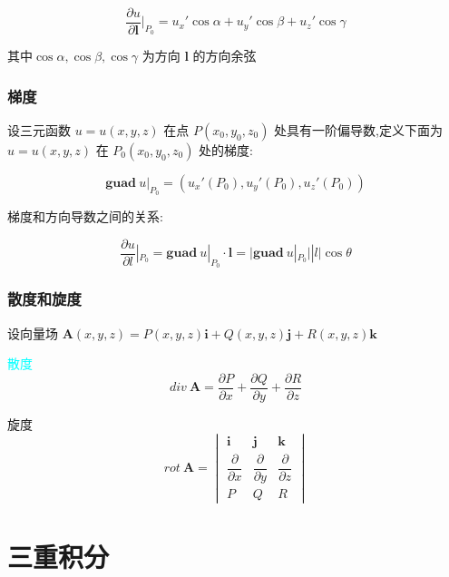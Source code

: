 \begin{theorem}[方向导数计算公式]
	$$\dfrac{\partial u}{\partial \boldsymbol{l}}|_{P_{0}}=u_{x}'\cos \alpha+u_{y}'\cos \beta+u_{z}'\cos \gamma$$
	
	其中$\cos \alpha,\cos \beta,\cos \gamma$ 为方向 $\boldsymbol{l}$ 的方向余弦
\end{theorem}

\subsection{梯度}

\begin{definition}[梯度]
	
	设三元函数 $u=u(x,y,z)$ 在点 $P(x_{0},y_{0},z_{0})$ 处具有一阶偏导数,定义下面为 $u=u(x,y,z)$ 在 $ P_{0}(x_{0},y_{0},z_{0})$ 处的梯度: 
	
	$$\boldsymbol{guad}\ u|_{P_{0}}=(u_{x}'(P_{0}),u_{y}'(P_{0}),u_{z}'(P_{0}))$$
	
	
	梯度和方向导数之间的关系: 

	$$\dfrac{\partial u}{\partial l}|_{P_{0}}=\boldsymbol{guad}\ u|_{P_{0}}\cdot \boldsymbol{l}=\big|\boldsymbol{guad}\ u|_{P_{0}}\big| |l|\cos \theta$$
\end{definition}

\subsection{散度和旋度}

\begin{definition}[散度和旋度]
	设向量场 $\boldsymbol{A}(x,y,z)=P(x,y,z)\boldsymbol{i} + Q(x,y,z)\boldsymbol{j} + R(x,y,z)\boldsymbol{k}$
	
	\textcolor{cyan}{散度} 
	$$div\ \boldsymbol{A}=\dfrac{\partial P}{\partial x}+\dfrac{\partial Q}{\partial y}+\dfrac{\partial R}{\partial z}$$
	
	\textcolor{purplea}{旋度}
	$$rot \ \boldsymbol{A} = 
	\begin{vmatrix}
		\boldsymbol{i} & \boldsymbol{j} & \boldsymbol{k}\\
		\dfrac{\partial}{\partial x} & \dfrac{\partial}{\partial y} & \dfrac{\partial}{\partial z} \\
		P & Q & R
	\end{vmatrix}$$
\end{definition}



\chapter{三重积分}

